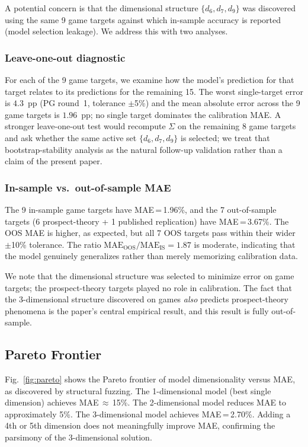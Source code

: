\documentclass[journal]{IEEEtran}
\begin{document}
A potential concern is that the dimensional structure $\{d_6, d_7, d_9\}$ was discovered using the same 9 game targets against which in-sample accuracy is reported (model selection leakage).
We address this with two analyses.

\subsubsection{Leave-one-out diagnostic}
For each of the 9 game targets, we examine how the model's prediction for that target relates to its predictions for the remaining 15.
The worst single-target error is $4.3$~pp (PG round~1, tolerance $\pm$5\%) and the mean absolute error across the 9 game targets is $1.96$~pp; no single target dominates the calibration MAE.
A stronger leave-one-out test would recompute $\Sigma$ on the remaining 8 game targets and ask whether the same active set $\{d_6,d_7,d_9\}$ is selected; we treat that bootstrap-stability analysis as the natural follow-up validation rather than a claim of the present paper.

\subsubsection{In-sample vs.\ out-of-sample MAE}
The 9 in-sample game targets have MAE\,=\,1.96\%, and the 7 out-of-sample targets (6 prospect-theory + 1 published replication) have MAE\,=\,3.67\%.
The OOS MAE is higher, as expected, but all 7 OOS targets pass within their wider $\pm$10\% tolerance.
The ratio $\text{MAE}_{\text{OOS}} / \text{MAE}_{\text{IS}} = 1.87$ is moderate, indicating that the model genuinely generalizes rather than merely memorizing calibration data.

We note that the dimensional structure was selected to minimize error on game targets; the prospect-theory targets played no role in calibration.
The fact that the 3-dimensional structure discovered on games \emph{also} predicts prospect-theory phenomena is the paper's central empirical result, and this result is fully out-of-sample.

\subsection{Pareto Frontier}

Fig.~\ref{fig:pareto} shows the Pareto frontier of model dimensionality versus MAE, as discovered by structural fuzzing.
The 1-dimensional model (best single dimension) achieves MAE\,$\approx$\,15\%.
The 2-dimensional model reduces MAE to approximately 5\%.
The 3-dimensional model achieves MAE\,=\,2.70\%.
Adding a 4th or 5th dimension does not meaningfully improve MAE, confirming the parsimony of the 3-dimensional solution.
\end{document}
